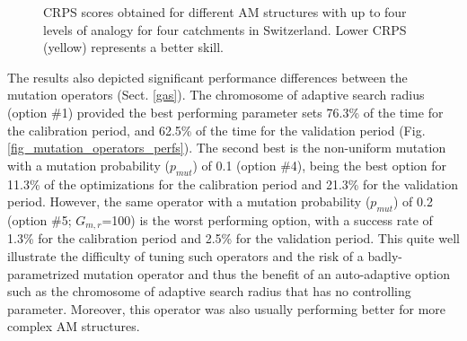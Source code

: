 \documentclass[draft]{agujournal2019}
\begin{document}
\begin{figure}[hbt]
	\noindent{}
	\caption{CRPS scores obtained for different AM structures with up to four levels of analogy for four catchments in Switzerland. Lower CRPS (yellow) represents a better skill.}
	\label{fig_structures}
\end{figure}

The results also depicted significant performance differences between the mutation operators (Sect. \ref{gas}). The chromosome of adaptive search radius (option \#1) provided the best performing parameter sets 76.3\% of the time for the calibration period, and 62.5\% of the time for the validation period (Fig. \ref{fig_mutation_operators_perfs}). The second best is the non-uniform mutation with a mutation probability ($p_{mut}$) of 0.1 (option \#4), being the best option for 11.3\% of the optimizations for the calibration period and 21.3\% for the validation period. However, the same operator with a  mutation probability ($p_{mut}$) of 0.2 (option \#5; $G_{m,r}$=100) is the worst performing option, with a success rate of 1.3\% for the calibration period and 2.5\% for the validation period. This quite well illustrate the difficulty of tuning such operators and the risk of a badly-parametrized mutation operator and thus the benefit of an auto-adaptive option such as the chromosome of adaptive search radius that has no controlling parameter. Moreover, this operator was also usually performing better for more complex AM structures.
\end{document}
